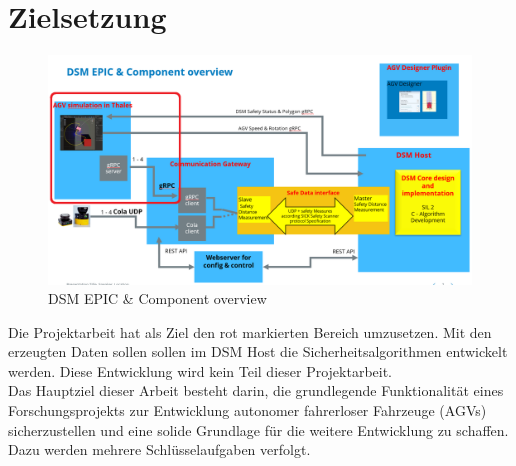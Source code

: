 





\section{Zielsetzung}
\begin{figure}[htp]
    \centering
    \includegraphics[width=(\textwidth)]{images/AGV_Overview.png}
    \caption{DSM EPIC \& Component overview}
    \label{fig:DSMoverview}
\end{figure}
Die Projektarbeit hat als Ziel den rot markierten Bereich umzusetzen. Mit den erzeugten Daten sollen sollen im DSM Host die Sicherheitsalgorithmen entwickelt werden. Diese Entwicklung wird kein Teil dieser Projektarbeit.\\

Das Hauptziel dieser Arbeit besteht darin, die grundlegende Funktionalität eines Forschungsprojekts zur Entwicklung autonomer fahrerloser Fahrzeuge (AGVs) sicherzustellen und eine solide Grundlage für die weitere Entwicklung zu schaffen. Dazu werden mehrere Schlüsselaufgaben verfolgt.\\

